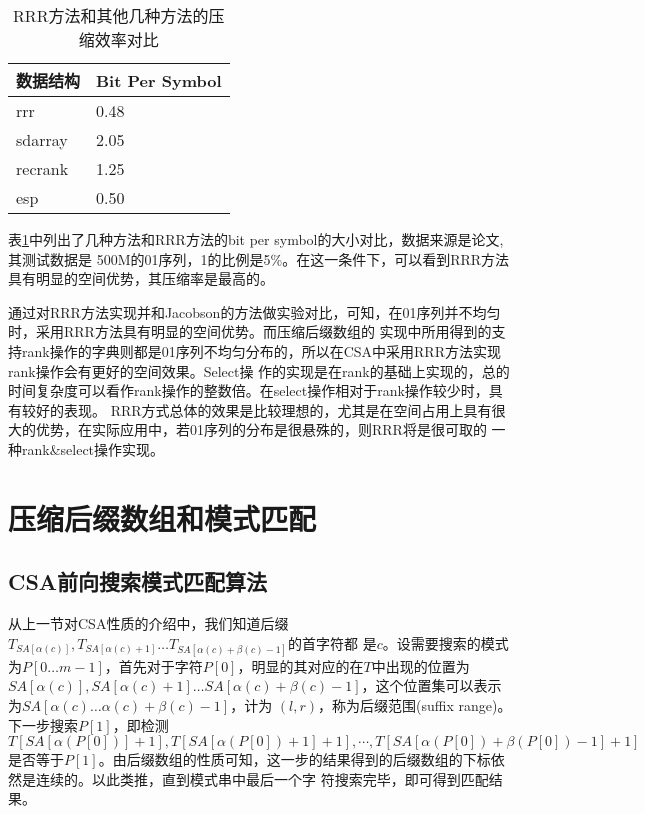 \begin{table}[htbp]
    \caption{RRR方法和其他几种方法的压缩效率对比}
    \label{tab:tabcom}
    \centering
    \begin{tabular}{ll}
    \toprule
    数据结构&Bit Per Symbol\\
    \midrule
    rrr&0.48\\
    sdarray&2.05\\
    recrank&1.25\\
    esp&0.50\\
    \bottomrule
    \end{tabular}
\end{table}

表\ref{tab:tabcom}中列出了几种方法和RRR方法的bit per symbol的大小对比，数据来源是论文\cite{claude2009practical},其测试数据是
500M的01序列，1的比例是5\%。在这一条件下，可以看到RRR方法具有明显的空间优势，其压缩率是最高的。

通过对RRR方法实现并和Jacobson的方法做实验对比，可知，在01序列并不均匀时，采用RRR方法具有明显的空间优势。而压缩后缀数组的
实现中所用得到的支持rank操作的字典则都是01序列不均匀分布的，所以在CSA中采用RRR方法实现rank操作会有更好的空间效果。Select操
作的实现是在rank的基础上实现的，总的时间复杂度可以看作rank操作的整数倍。在select操作相对于rank操作较少时，具有较好的表现。
RRR方式总体的效果是比较理想的，尤其是在空间占用上具有很大的优势，在实际应用中，若01序列的分布是很悬殊的，则RRR将是很可取的
一种rank\&select操作实现。

\section{压缩后缀数组和模式匹配}
\subsection{CSA前向搜索模式匹配算法}
从上一节对CSA性质的介绍中，我们知道后缀$T_{SA[\alpha(c)]},T_{SA[\alpha(c)+1]}\ldots T_{SA[\alpha(c)+\beta(c)-1]}$的首字符都
是$c$。设需要搜索的模式为$P[0\ldots m-1]$，首先对于字符$P[0]$，明显的其对应的在$T$中出现的位置为
$SA[\alpha(c)],SA[\alpha(c)+1]\ldots SA[\alpha(c)+\beta(c)-1]$，这个位置集可以表示为$SA[\alpha(c)\ldots\alpha(c)+\beta(c)-1]$，计为
$(l,r)$，称为后缀范围(suffix range)。下一步搜索$P[1]$，即检测$T[SA[\alpha(P[0])]+1],T[SA[\alpha(P[0])+1]+1],\cdots ,T[SA[\alpha(P[0])+\beta(P[0])-1]+1]$
是否等于$P[1]$。由后缀数组的性质可知，这一步的结果得到的后缀数组的下标依然是连续的。以此类推，直到模式串中最后一个字
符搜索完毕，即可得到匹配结果。

